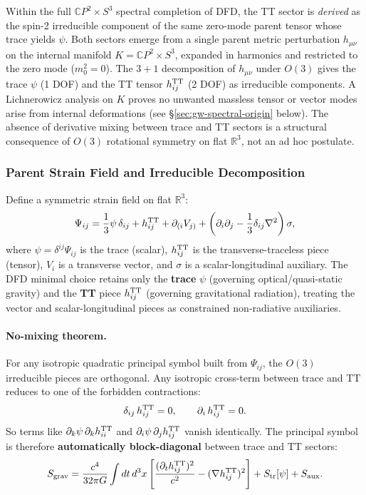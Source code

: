 Within the full $\mathbb{C}P^2 \times S^3$ spectral completion of DFD,
the TT sector is \textit{derived} as the spin-2 irreducible component of
the same zero-mode parent tensor whose trace yields $\psi$.  Both sectors
emerge from a single parent metric perturbation $h_{\mu\nu}$ on the
internal manifold $K = \mathbb{C}P^2 \times S^3$, expanded in harmonics
and restricted to the zero mode ($m_0^2 = 0$).  The $3+1$ decomposition
of $h_{\mu\nu}$ under $O(3)$ gives the trace $\psi$ (1 DOF) and the
TT tensor $h_{ij}^{\rm TT}$ (2 DOF) as irreducible components.
A Lichnerowicz analysis on $K$ proves no unwanted massless tensor or
vector modes arise from internal deformations (see
\S\ref{sec:gw-spectral-origin} below).
The absence of derivative mixing between trace and TT sectors is a
structural consequence of $O(3)$ rotational symmetry on flat $\mathbb{R}^3$,
not an ad hoc postulate.

\subsubsection{Parent Strain Field and Irreducible Decomposition}\label{sec:gw-parent}

Define a symmetric strain field on flat $\mathbb{R}^3$:
\begin{equation}\label{eq:parent-strain}
\Psi_{ij} = \frac{1}{3}\psi\,\delta_{ij} + h_{ij}^{\rm TT} + \partial_{(i}V_{j)} + \left(\partial_i\partial_j - \frac{1}{3}\delta_{ij}\nabla^2\right)\sigma,
\end{equation}
where $\psi = \delta^{ij}\Psi_{ij}$ is the trace (scalar), $h_{ij}^{\rm TT}$ is the transverse-traceless piece (tensor), $V_i$ is a transverse vector, and $\sigma$ is a scalar-longitudinal auxiliary.  The DFD minimal choice retains only the \textbf{trace} $\psi$ (governing optical/quasi-static gravity) and the \textbf{TT} piece $h_{ij}^{\rm TT}$ (governing gravitational radiation), treating the vector and scalar-longitudinal pieces as constrained non-radiative auxiliaries.

\paragraph{No-mixing theorem.}
For any isotropic quadratic principal symbol built from $\Psi_{ij}$, the $O(3)$ irreducible pieces are orthogonal.  Any isotropic cross-term between trace and TT reduces to one of the forbidden contractions:
\begin{equation}
\delta_{ij}\,h_{ij}^{\rm TT} = 0, \qquad \partial_i\,h_{ij}^{\rm TT} = 0.
\end{equation}
So terms like $\partial_k\psi\,\partial_k h_{ii}^{\rm TT}$ and $\partial_i\psi\,\partial_j h_{ij}^{\rm TT}$ vanish identically.  The principal symbol is therefore \textbf{automatically block-diagonal} between trace and TT sectors:
\begin{equation}\label{eq:S-block}
S_{\rm grav} = \frac{c^4}{32\pi G}\int dt\,d^3x\left[\frac{(\partial_t h_{ij}^{\rm TT})^2}{c^2} - (\nabla h_{ij}^{\rm TT})^2\right] + S_{\rm tr}[\psi] + S_{\rm aux}.
\end{equation}

